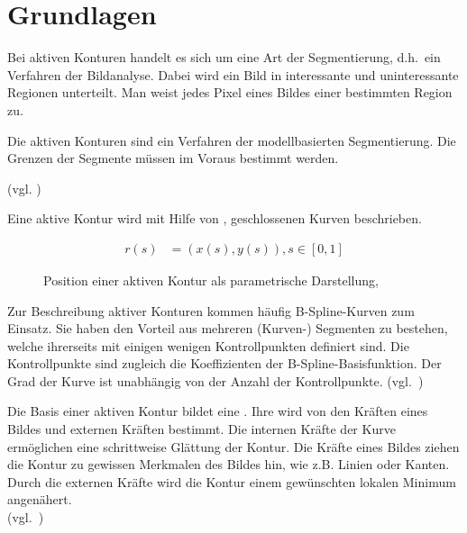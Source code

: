 \chapter{Grundlagen}
\label{chap:basics}


Bei aktiven Konturen handelt es sich um eine Art der Segmentierung, d.h.\ ein Verfahren der Bildanalyse. Dabei wird ein Bild in interessante und uninteressante Regionen unterteilt. Man weist jedes Pixel eines Bildes einer bestimmten Region zu.

Die aktiven Konturen sind ein Verfahren der modellbasierten Segmentierung. Die Grenzen der Segmente müssen im Voraus bestimmt werden.

(vgl. \citeauthor*[S. 133 und 144]{hudritsch:script:cp}) %

Eine aktive Kontur wird mit Hilfe von , geschlossenen Kurven beschrieben.

\begin{figure}[H]
    \renewcommand\figurename{Auflistung}
    \begin{align}
        r(s) & = (x(s), y(s)), s \in [0,1]
    \end{align}
    \caption{Position einer aktiven Kontur als parametrische Darstellung,~\cite{kass88snakes:active}}
\end{figure}

Zur Beschreibung aktiver Konturen kommen häufig B-Spline-Kurven zum Einsatz. Sie haben den Vorteil aus mehreren (Kurven-) Segmenten zu bestehen, welche ihrerseits mit einigen wenigen Kontrollpunkten definiert sind. Die Kontrollpunkte sind zugleich die Koeffizienten der B-Spline-Basisfunktion. Der Grad der Kurve ist unabhängig von der Anzahl der Kontrollpunkte. (vgl.~\citeauthor*[S. 79]{fuhrer:script:splines}) %

Die Basis einer aktiven Kontur bildet eine . Ihre  wird von den Kräften eines Bildes und externen Kräften bestimmt. Die internen Kräfte der Kurve ermöglichen eine schrittweise Glättung der Kontur. Die Kräfte eines Bildes ziehen die Kontur zu gewissen Merkmalen des Bildes hin, wie z.B. Linien oder Kanten. Durch die externen Kräfte wird die Kontur einem gewünschten lokalen Minimum angenähert.\\
(vgl.~\citeauthor*[S. 323]{kass88snakes:active}) %


